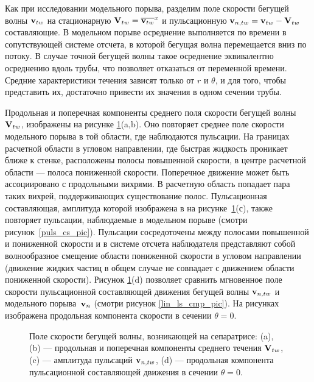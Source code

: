 Как при исследовании модельного порыва, разделим поле скорости бегущей волны $\mathbf{v}_{tw}$ на стационарную $\mathbf{V}_{tw} = \overline{\mathbf{v}_{tw}}^{x}$ и пульсационную $\mathbf{v}_{n,tw} = \mathbf{v}_{tw} - \mathbf{V}_{tw}$ составляющие. В модельном порыве осреднение выполняется по времени в сопутствующей системе отсчета, в которой бегущая волна перемещается вниз по потоку. В случае точной бегущей волны такое осреднение эквивалентно осреднению вдоль трубы, что позволяет отказаться от переменной времени. Средние характеристики течения зависят только от $r$ и $\theta$, и для того, чтобы представить их, достаточно привести их значения в одном сечении трубы.

Продольная и поперечная компоненты среднего поля скорости бегущей волны $\mathbf{V}_{tw}$, изображены на рисунке \ref{pipetw_pic}(a,b). Оно повторяет среднее поле скорости модельного порыва в той области, где наблюдаются пульсации. На границах расчетной области в угловом направлении, где быстрая жидкость проникает ближе к стенке, расположены полосы повышенной скорости, в центре расчетной области --- полоса пониженной скорости. Поперечное движение может быть ассоциировано с продольными вихрями. В расчетную область попадает пара таких вихрей, поддерживающих существование полос. Пульсационная составляющая, амплитуда которой изображена в на рисунке~\ref{pipetw_pic}(с), также повторяет пульсации, наблюдаемые в модельном порыве (смотри рисунок~\ref{puls_cs_pic}). Пульсации сосредоточены между полосами повышенной и пониженной скорости и в системе отсчета наблюдателя представляют собой волнообразное смещение области пониженной скорости в угловом направлении (движение жидких частиц в общем случае не совпадает с движением области пониженной скорости). Рисунок \ref{pipetw_pic}(d) позволяет сравнить мгновенное поле скорости пульсационной составляющей движения бегущей волны $\mathbf{v}_{n,tw}$ и модельного порыва~$\mathbf{v}_n$ (смотри рисунок \ref{lin_ls_cmp_pic}). На рисунках изображена продольная компонента скорости в сечении $\theta = 0$. 
 

\begin{figure}
\caption{Поле скорости бегущей волны, возникающей на сепаратрисе: (a), (b) --- продольная и поперечная компоненты среднего течения $\mathbf{V}_{tw}$, (c) --- амплитуда пульсаций $\mathbf{v}_{n,tw}$, (d) --- продольная компонента пульсационной составляющей движения в сечении $\theta = 0$.}
\label{pipetw_pic}
\end{figure}

